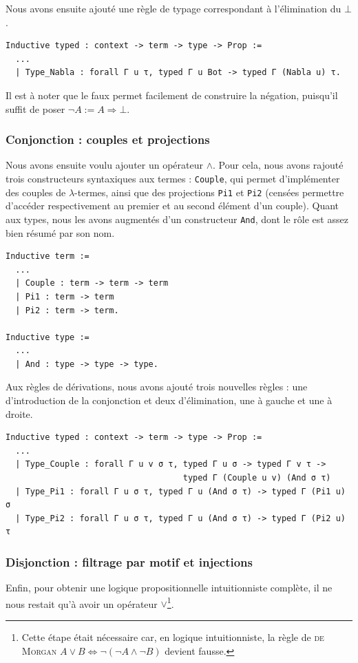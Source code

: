 \documentclass[a4paper]{article}
\begin{document}
Nous avons ensuite ajouté une règle de typage correspondant à l'élimination du $\bot$.
\begin{verbatim}
Inductive typed : context -> term -> type -> Prop :=
  ...
  | Type_Nabla : forall Γ u τ, typed Γ u Bot -> typed Γ (Nabla u) τ.
\end{verbatim}

Il est à noter que le faux permet facilement de construire la négation, puisqu'il suffit de poser $\neg A := A \Rightarrow \bot$.

\subsubsection{Conjonction : couples et projections}

Nous avons ensuite voulu ajouter un opérateur $\wedge$. Pour cela, nous avons rajouté trois constructeurs syntaxiques aux termes : \verb+Couple+, qui permet d'implémenter des couples de $\lambda$-termes, ainsi que des projections \verb+Pi1+ et \verb+Pi2+ (censées permettre d'accéder respectivement au premier et au second élément d'un couple). Quant aux types, nous les avons augmentés d'un constructeur \verb+And+, dont le rôle est assez bien résumé par son nom.
\begin{verbatim}
Inductive term :=
  ...
  | Couple : term -> term -> term
  | Pi1 : term -> term
  | Pi2 : term -> term.

Inductive type :=
  ...
  | And : type -> type -> type.
\end{verbatim}

Aux règles de dérivations, nous avons ajouté trois nouvelles règles : une d'introduction de la conjonction et deux d'élimination, une à gauche et une à droite.
\begin{verbatim}
Inductive typed : context -> term -> type -> Prop :=
  ...
  | Type_Couple : forall Γ u v σ τ, typed Γ u σ -> typed Γ v τ ->
                                    typed Γ (Couple u v) (And σ τ)
  | Type_Pi1 : forall Γ u σ τ, typed Γ u (And σ τ) -> typed Γ (Pi1 u) σ
  | Type_Pi2 : forall Γ u σ τ, typed Γ u (And σ τ) -> typed Γ (Pi2 u) τ
\end{verbatim}

\subsubsection{Disjonction : filtrage par motif et injections}

Enfin, pour obtenir une logique propositionnelle intuitionniste complète, il ne nous restait qu'à avoir un opérateur $\vee$\footnote{Cette étape était nécessaire car, en logique intuitionniste, la règle de \textsc{de Morgan} $A \vee B \Leftrightarrow \neg (\neg A \wedge \neg B)$ devient fausse.}.
\end{document}

